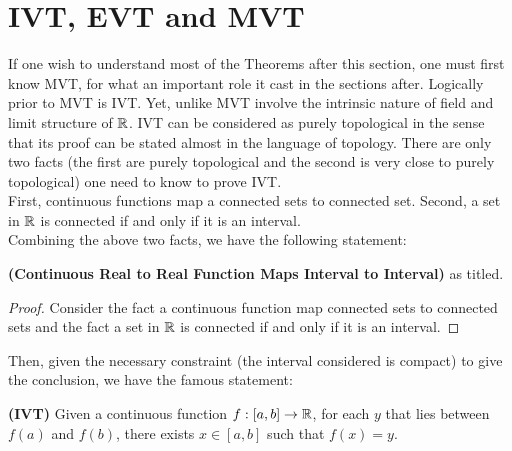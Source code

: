 \documentclass{report}
\begin{document}
\section{IVT, EVT and MVT}
\begin{mdframed}
  If one wish to understand most of the Theorems after this section, one must first know MVT, for what an important role it cast in the sections after. Logically prior to MVT is IVT. Yet, unlike MVT involve the intrinsic nature of field and limit structure of $\mathbb{R}$. IVT can be considered as purely topological in the sense that its proof can be stated almost in the language of topology. There are only two facts (the first are purely topological and the second is very close to purely topological) one need to know to prove IVT.\\

First, continuous functions map a connected sets to  connected set. Second, a set in $\mathbb{R}$ is connected if and only if it is an interval.\\

Combining the above two facts, we have the following statement:  
\label{13}
\end{mdframed}
\label{5}
\begin{theorem}
\textbf{(Continuous Real to Real Function Maps Interval to Interval)} as titled.
\end{theorem}
\begin{proof}
Consider the fact a continuous function map connected sets to connected sets and the fact a set in $\mathbb{R}$ is connected if and only if it is an interval.
\end{proof}
\begin{mdframed}
\label{14}
Then, given the necessary constraint (the interval considered is compact) to give the conclusion, we have the famous statement:
\label{6}
\end{mdframed}
\begin{theorem}
\textbf{(IVT)} Given a continuous function $f:[a,b]\to \mathbb{R}$, for each $y$ that lies between $f(a)$ and $f(b)$, there exists $x \in [a,b]$ such that $f(x)=y$.
\end{theorem}
\end{document}

